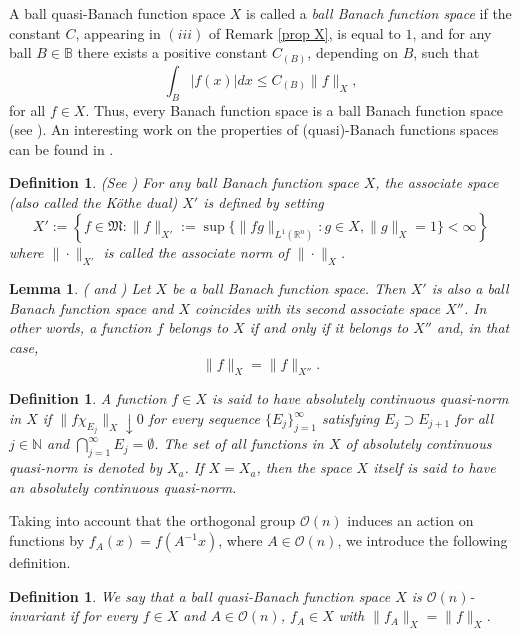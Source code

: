 \documentclass[oneside,10pt]{article}
\newtheorem{definition}[theorem]{Definition}
\newtheorem{lemma}[theorem]{Lemma}
\begin{document}
A ball quasi-Banach function space $X$ is called a \textit{ball Banach function space} if the constant $C$, appearing in $(iii)$ of 
Remark \ref{prop X}, is equal to $1$, and for any ball $B \in \mathbb{B}$ there exists a positive constant $C_{(B)}$, depending on $B$, such that
\[
\int_{B} |f(x)| dx \leq C_{(B)} \| f \|_{X},
\]
for all $f \in X$. Thus, every Banach function space is a ball Banach function space (see \cite[Definition 1.3]{Bennett}). An interesting work on the properties of (quasi)-Banach functions spaces can be found in \cite{Nekvinda}.


\begin{definition} (See \cite{Bennett})
For any ball Banach function space $X$, the associate space (also called the K\"othe dual) $X'$ is defined by setting
\[
X' := \left\{ f \in \mathfrak{M} : \| f \|_{X'} := \sup \{ \| f g\|_{L^{1}(\mathbb{R}^n)} : g \in X, \| g \|_{X} = 1 \} < \infty \right\}
\]
where $\| \cdot \|_{X'}$ is called the associate norm of $\| \cdot \|_{X}$.
\end{definition}

\begin{lemma} (\cite[Proposition 2.3]{sawa} and \cite[Lemma 2.6]{Zhang}) \label{doble dual}
Let $X$ be a ball Banach function space. Then $X'$ is also a ball Banach function space and $X$ coincides with its second associate space 
$X''$. In other words, a function $f$ belongs to $X$ if and only if it belongs to $X''$ and, in that case,
\[
\| f \|_{X} = \| f \|_{X''}.
\]
\end{lemma}

\begin{definition}
A function $f \in X$ is said to have absolutely continuous quasi-norm in $X$ if $\| f \chi_{E_j} \|_{X} \downarrow 0$ for every sequence 
$\{ E_j \}_{j=1}^{\infty}$ satisfying $E_j \supset E_{j+1}$ for all $j \in \mathbb{N}$ and $\bigcap_{j=1}^{\infty} E_j = \emptyset$. The set of all functions in $X$ of absolutely continuous quasi-norm is denoted by $X_{a}$. If $X=X_a$, then the space $X$ itself is said to have an absolutely continuous quasi-norm.
\end{definition}

Taking into account that the orthogonal group $\mathcal{O}(n)$ induces an action on functions by $f_{A}(x) = f(A^{-1}x)$, where $A \in \mathcal{O}(n)$, we introduce the following definition.

\begin{definition}
We say that a ball quasi-Banach function space $X$ is $\mathcal{O}(n)$-invariant if for every $f \in X$ and 
$A \in \mathcal{O}(n)$, $f_A \in X$ with $\| f_A \|_{X} =  \| f \|_{X}$.
\end{definition}
\end{document}
